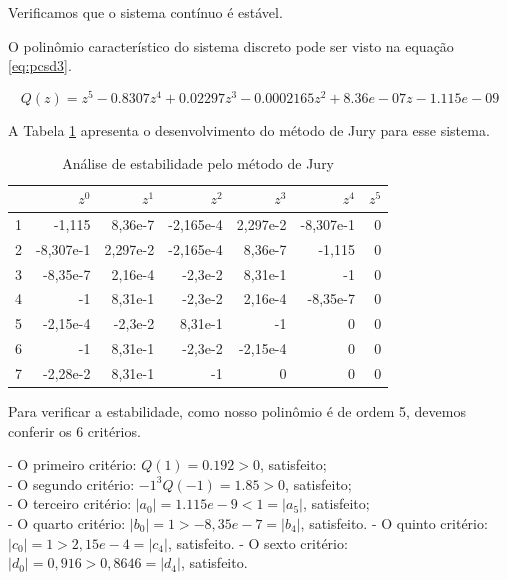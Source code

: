     Verificamos que o sistema contínuo é estável.

    O polinômio característico do sistema discreto pode ser visto na equação \ref{eq:pcsd3}.

    \begin{equation}
        Q(z) = z^5 - 0.8307 z^4 + 0.02297 z^3 - 0.0002165 z^2 + 8.36e-07 z  - 1.115e-09                                                         
        \label{eq:pcsd3}
    \end{equation}

    A Tabela \ref{tab:JE3} apresenta o desenvolvimento do método de Jury para esse sistema.

    \begin{table}[!ht]
        \centering
        \caption{Análise de estabilidade pelo método de Jury} 
        \begin{tabular}{l| r r r r r r}
            & $z^0$ & $z^1$ & $z^2$ & $z^3$ & $z^4$ & $z^5$\\
            \hline
            1 & -1{,}115 & 8{,}36e-7 & -2{,}165e-4 & 2{,}297e-2 & -8{,}307e-1 & 0\\
            2 & -8{,}307e-1 & 2{,}297e-2 & -2{,}165e-4  & 8{,}36e-7 & -1{,}115 & 0\\
            3 & -8{,}35e-7 & 2{,}16e-4 & -2{,}3e-2  & 8{,}31e-1 & -1 & 0\\
            4 & -1 & 8{,}31e-1 & -2{,}3e-2  & 2{,}16e-4 & -8{,}35e-7 & 0\\
            5 & -2{,}15e-4 & -2{,}3e-2 & 8{,}31e-1  & -1 & 0 & 0\\
            6 & -1 &  8{,}31e-1  & -2{,}3e-2 & -2{,}15e-4 & 0 & 0\\
            7 & -2{,}28e-2 & 8{,}31e-1  & -1 & 0 & 0 & 0\\

        \end{tabular}                
        \label{tab:JE3}    
    \end{table}

    Para verificar a estabilidade, como nosso polinômio é de ordem 5, devemos conferir os 6 critérios.

    - O primeiro critério: $Q(1)= 0.192 > 0$, satisfeito; \\
    - O segundo critério: $-1^3 Q(-1) = 1.85 > 0$, satisfeito;\\
    - O terceiro critério: $|a_0| = 1.115e-9 < 1 = |a_5|$, satisfeito; \\
    - O quarto critério: $|b_0| = 1 >-8,35e-7 = |b_4| $, satisfeito. 
    - O quinto critério: $|c_0| = 1 > 2,15e-4 = |c_4| $, satisfeito. 
    - O sexto critério: $|d_0| = 0,916 > 0,8646 = |d_4| $, satisfeito. 
    
